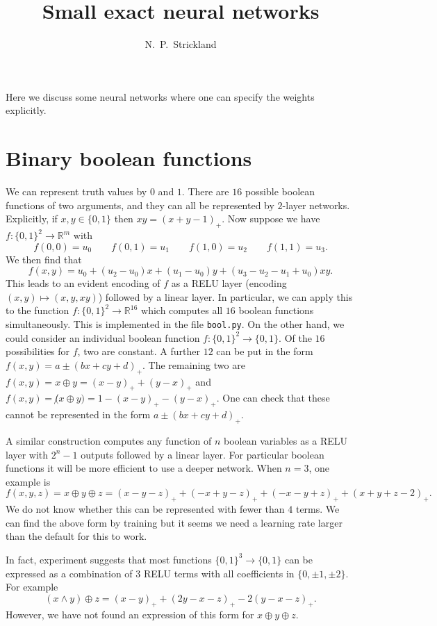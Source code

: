 \documentclass{amsart}
\newcommand{\R}         {{\mathbb{R}}}
\renewcommand{\:}{\colon}
\theoremstyle{definition}
\begin{document}
\title{Small exact neural networks}
\author{N.~P.~Strickland}

\maketitle 


Here we discuss some neural networks where one can specify the weights
explicitly. 

\section{Binary boolean functions}

We can represent truth values by $0$ and $1$.  There are $16$
possible boolean functions of two arguments, and they can all be
represented by $2$-layer networks.  Explicitly, if $x,y\in\{0,1\}$
then $xy=(x+y-1)_+$.  Now suppose we have $f\:\{0,1\}^2\to\R^m$ with 
\[ f(0,0) = u_0 \qquad f(0,1) = u_1 \qquad 
   f(1,0) = u_2 \qquad f(1,1) = u_3.
\]
We then find that 
\[ f(x,y) = u_0 + (u_2-u_0)x + (u_1-u_0)y + (u_3-u_2-u_1+u_0)xy. \]
This leads to an evident encoding of $f$ as a RELU layer (encoding
$(x,y)\mapsto(x,y,xy)$) followed by a linear layer.  In particular, we
can apply this to the function $f\:\{0,1\}^2\to\R^{16}$ which computes
all $16$ boolean functions simultaneously.  This is implemented in the
file \texttt{bool.py}.  On the other hand, we could consider an
individual boolean function $f\:\{0,1\}^2\to\{0,1\}$.  Of the $16$
possibilities for $f$, two are constant.  A further $12$ can be put in
the form $f(x,y)=a\pm(bx+cy+d)_+$.  The remaining two are
$f(x,y)=x\oplus y=(x-y)_++(y-x)_+$ and 
$f(x,y)=\not(x\oplus y)=1-(x-y)_+-(y-x)_+$.  One can check that these
cannot be represented in the form $a\pm(bx+cy+d)_+$. 

A similar construction computes any function of $n$ boolean variables
as a RELU layer with $2^n-1$ outputs followed by a linear layer.  For
particular boolean functions it will be more efficient to use a deeper
network.  When $n=3$, one example is 
\[ f(x,y,z) =  x\oplus y\oplus z = 
   (x-y-z)_++(-x+y-z)_++(-x-y+z)_++(x+y+z-2)_+.
\]
We do not know whether this can be represented with fewer than $4$
terms.  We can find the above form by training but it seems we need a
learning rate larger than the default for this to work.

In fact, experiment suggests that most functions $\{0,1\}^3\to\{0,1\}$
can be expressed as a combination of $3$ RELU terms with all
coefficients in $\{0,\pm 1,\pm 2\}$.  For example
\[ (x\wedge y)\oplus z = 
    (x-y)_++(2y-x-z)_+-2(y-x-z)_+.
\]
However, we have not found an expression of this form for $x\oplus
y\oplus z$.
\end{document}
